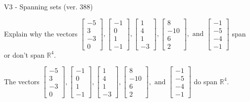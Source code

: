 \begin{exercise}
  \begin{exerciseTitle}V3 - Spanning sets (ver. 388)\end{exerciseTitle}
  \begin{exerciseStatement}
    Explain why the vectors \(\left[\begin{array}{r}
-5 \\
3 \\
-3 \\
0
\end{array}\right] , \left[\begin{array}{r}
-1 \\
0 \\
1 \\
-1
\end{array}\right] , \left[\begin{array}{r}
1 \\
4 \\
1 \\
-3
\end{array}\right] , \left[\begin{array}{r}
8 \\
-10 \\
6 \\
2
\end{array}\right] , \text{ and } \left[\begin{array}{r}
-1 \\
-5 \\
-4 \\
-1
\end{array}\right]\) span or don't span \(\mathbb{R}^4\). 
	


  \end{exerciseStatement}
  \begin{exerciseAnswer}
   The vectors \(\left[\begin{array}{r}
-5 \\
3 \\
-3 \\
0
\end{array}\right] , \left[\begin{array}{r}
-1 \\
0 \\
1 \\
-1
\end{array}\right] , \left[\begin{array}{r}
1 \\
4 \\
1 \\
-3
\end{array}\right] , \left[\begin{array}{r}
8 \\
-10 \\
6 \\
2
\end{array}\right] , \text{ and } \left[\begin{array}{r}
-1 \\
-5 \\
-4 \\
-1
\end{array}\right]\) 
  	 do  
	span \(\mathbb{R}^4\).
  



\end{exerciseAnswer}
\end{exercise}
